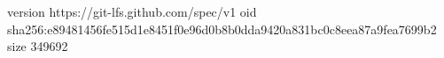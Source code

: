 version https://git-lfs.github.com/spec/v1
oid sha256:e89481456fe515d1e8451f0e96d0b8b0dda9420a831bc0c8eea87a9fea7699b2
size 349692
